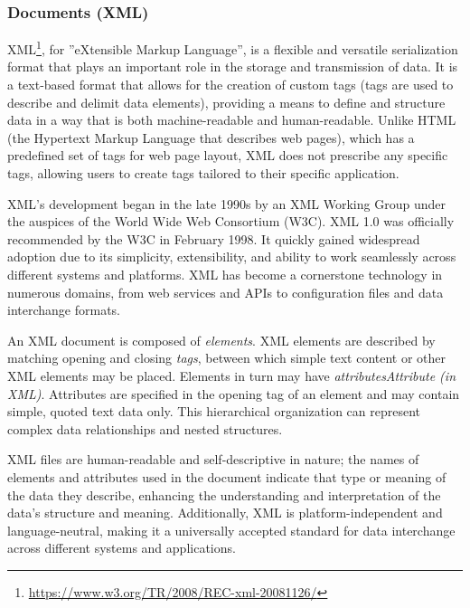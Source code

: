 \subsubsection*{Documents (XML)}

XML\footnote{\url{https://www.w3.org/TR/2008/REC-xml-20081126/}}, for ''eXtensible Markup Language'', is a flexible and versatile serialization format that plays an important role in the storage and transmission of data. It is a text-based format that allows for the creation of custom tags (tags are used to describe and delimit data elements), providing a means to define and structure data in a way that is both machine-readable and human-readable. Unlike HTML (the Hypertext Markup Language that describes web pages), which has a predefined set of tags for web page layout, XML does not prescribe any specific tags, allowing users to create tags tailored to their specific application.

XML's development began in the late 1990s by an XML Working Group under the auspices of the World Wide Web Consortium (W3C). XML 1.0 was officially recommended by the W3C in February 1998. It quickly gained widespread adoption due to its simplicity, extensibility, and ability to work seamlessly across different systems and platforms. XML has become a cornerstone technology in numerous domains, from web services and APIs to configuration files and data interchange formats.

An XML document is composed of \emph{elements}. XML elements are described by matching opening and closing \emph{tags}, between which simple text content or other XML elements may be placed. Elements in turn may have \emph{attributes}\emph{Attribute (in XML)}. Attributes are specified in the opening tag of an element and may contain simple, quoted text data only. This hierarchical organization can represent complex data relationships and nested structures. 

XML files are human-readable and self-descriptive in nature; the names of elements and attributes used in the document indicate that type or meaning of the data they describe, enhancing the understanding and interpretation of the data's structure and meaning. Additionally, XML is platform-independent and language-neutral, making it a universally accepted standard for data interchange across different systems and applications. 

